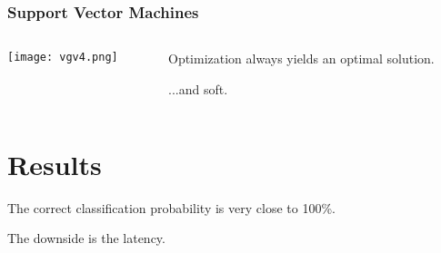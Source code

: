 \documentclass{beamer}
\begin{document}
\begin{frame} \frametitle{Support Vector Machines}
\begin{columns}
\begin{column}{5cm}
\texttt{[image: vgv4.png]}
\end{column}
\begin{column}{5cm}
Optimization always yields an optimal solution.

...and soft.
\end{column} 
\end{columns}
\end{frame}

\section{Results}
\begin{frame}
The correct classification probability is very close to 100\%.

The downside is the latency.
\end{frame}
\end{document}
